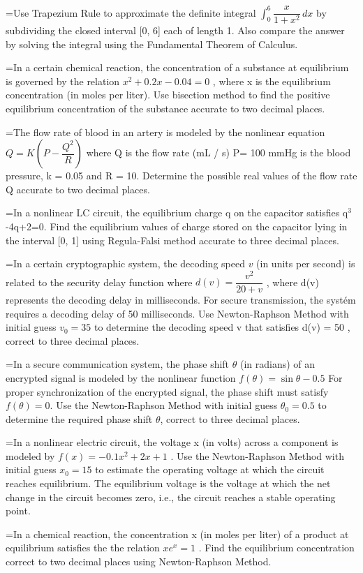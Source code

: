 \documentclass[11pt,a4paper]{article}
\newlength{\qw}\settowidth{\qw}{\textbf{888.}\ }
\newcommand{\q}[2]{%
  \Needspace{3\baselineskip}%
  \par\medskip\noindent\hangindent=\qw\hangafter=1\makebox[\qw][l]{\textbf{#1.}}#2\par}
\begin{document}
\q{506}{Use Trapezium Rule to approximate the definite integral $\displaystyle\int_{0}^{6}\dfrac{x}{1+x^{2}}\,dx$ by subdividing the closed interval [0, 6] each of length 1. Also compare the answer by solving the integral using the Fundamental Theorem of Calculus.}
\q{507}{In a certain chemical reaction, the concentration of a substance at equilibrium is governed by the relation $x^{2}+0.2x-0.04=0$ , where x is the equilibrium concentration (in moles per liter). Use bisection method to find the positive equilibrium concentration of the substance accurate to two decimal places.}
\q{508}{The flow rate of blood in an artery is modeled by the nonlinear equation $Q=K\left(P-\dfrac{Q^{2}}{R}\right)$ where Q is the flow rate (mL / s) P= 100 mmHg is the blood pressure, k = 0.05 and R = 10. Determine the possible real values of the flow rate Q accurate to two decimal places.}
\q{509}{In a nonlinear LC circuit, the equilibrium charge q on the capacitor satisfies q$^{3}$-4q+2=0. Find the equilibrium values of charge stored on the capacitor lying in the interval [0, 1] using Regula-Falsi method accurate to three decimal places.}
\q{510}{In a certain cryptographic system, the decoding speed $v$ (in units per second) is related to the security delay function where $d(v)=\dfrac{v^{2}}{20+v}$ , where d(v) represents the decoding delay in milliseconds. For secure transmission, the systém requires a decoding delay of 50 milliseconds. Use Newton-Raphson Method with initial guess $v_{0}=35$ to determine the decoding speed v that satisfies d(v) = 50 , correct to three decimal places.}
\q{511}{In a secure communication system, the phase shift $\theta$ (in radians) of an encrypted signal is modeled by the nonlinear function $f(\theta)=\sin\theta-0.5$ For proper synchronization of the encrypted signal, the phase shift must satisfy $f(\theta)=0$. Use the Newton-Raphson Method with initial guess $\theta_{0}=0.5$ to determine the required phase shift $\theta$, correct to three decimal places.}
\q{512}{In a nonlinear electric circuit, the voltage x (in volts) across a component is modeled by $f(x)=-0.1x^{2}+2x+1$ . Use the Newton-Raphson Method with initial guess $x_{0}=15$ to estimate the operating voltage at which the circuit reaches equilibrium. The equilibrium voltage is the voltage at which the net change in the circuit becomes zero, i.e., the circuit reaches a stable operating point.}
\q{513}{In a chemical reaction, the concentration x (in moles per liter) of a product at equilibrium satisfies the the relation $xe^{x}=1$ . Find the equilibrium concentration correct to two decimal places using Newton-Raphson Method.}
\end{document}
